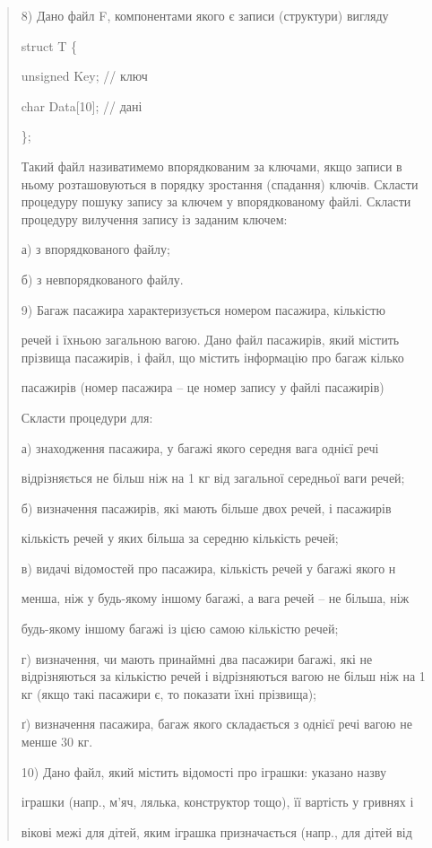 \documentclass[]{article}
\begin{document}
\begin{quote}
8) Дано файл F, компонентами якого є записи (структури) вигляду

struct T \{

unsigned Key; // ключ

char Data{[}10{]}; // дані

\};

Такий файл називатимемо впорядкованим за ключами, якщо записи в ньому
розташовуються в порядку зростання (спадання) ключів. Скласти процедуру
пошуку запису за ключем у впорядкованому файлі. Скласти процедуру
вилучення запису із заданим ключем:

а) з впорядкованого файлу;

б) з невпорядкованого файлу.

9) Багаж пасажира характеризується номером пасажира, кількістю

речей і їхньою загальною вагою. Дано файл пасажирів, який містить
прізвища пасажирів, і файл, що містить інформацію про багаж кілько

пасажирів (номер пасажира -- це номер запису у файлі пасажирів)

Скласти процедури для:

а) знаходження пасажира, у багажі якого середня вага однієї речі

відрізняється не більш ніж на 1 кг від загальної середньої ваги речей;

б) визначення пасажирів, які мають більше двох речей, і пасажирів

кількість речей у яких більша за середню кількість речей;

в) видачі відомостей про пасажира, кількість речей у багажі якого н

менша, ніж у будь-якому іншому багажі, а вага речей -- не більша, ніж

будь-якому іншому багажі із цією самою кількістю речей;

г) визначення, чи мають принаймні два пасажири багажі, які не
відрізняються за кількістю речей і відрізняються вагою не більш ніж на 1
кг (якщо такі пасажири є, то показати їхні прізвища);

ґ) визначення пасажира, багаж якого складається з однієї речі вагою не
менше 30 кг.

10) Дано файл, який містить відомості про іграшки: указано назву

іграшки (напр., м'яч, лялька, конструктор тощо), її вартість у гривнях і

вікові межі для дітей, яким іграшка призначається (напр., для дітей від


\end{quote}
\end{document}
